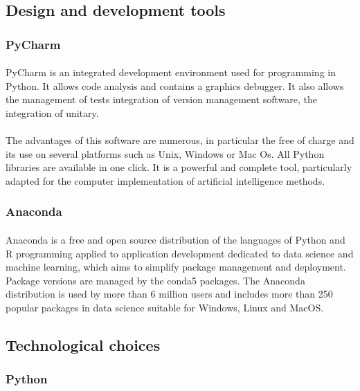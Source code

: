 \documentclass{article}
\begin{document}
\subsection{Design and development tools}
\subsubsection{PyCharm}
\paragraph{}
\setlength{\parindent}{2cm}
PyCharm is an integrated development environment used for
programming in Python. It allows code analysis and contains a
graphics debugger. It also allows the management of tests
integration of version management software, the integration of unitary.~\cite{pycharm} 
\paragraph{}
\setlength{\parindent}{2cm}
The advantages of this software are numerous, in particular the free of charge and its use on several platforms such as Unix, Windows or Mac Os. All Python libraries are available in one click. It is a powerful and complete tool, particularly adapted for the computer implementation of artificial intelligence methods.

\subsubsection{Anaconda}
\paragraph{}
\setlength{\parindent}{2cm}
Anaconda is a free and open source distribution of the languages of
Python and R programming applied to application development
dedicated to data science and machine learning,
which aims to simplify package management and deployment.
Package versions are managed by the
conda5 packages. The Anaconda distribution is used by more than 6
million users and includes more than 250 popular packages in
data science suitable for Windows, Linux and MacOS.
~\cite{anaconda} 
\subsection{Technological choices}
\subsubsection{Python}
\end{document}
